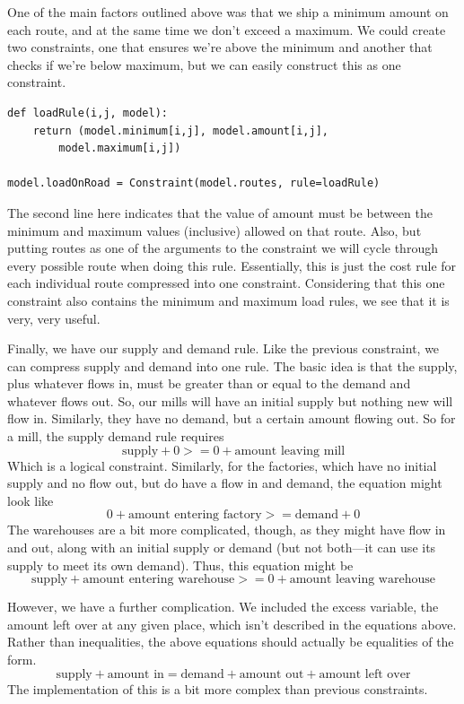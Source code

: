 \documentclass{article}
\begin{document}
One of the main factors outlined above was that we ship a minimum amount on each route, and at the same time we don't exceed a maximum.  We could create two constraints, one that ensures we're above the minimum and another that checks if we're below maximum, but we can easily construct this as one constraint.

\begin{verbatim}
def loadRule(i,j, model):
    return (model.minimum[i,j], model.amount[i,j], 
        model.maximum[i,j])

model.loadOnRoad = Constraint(model.routes, rule=loadRule)
\end{verbatim}

The second line here indicates that the value of amount must be between the minimum and maximum values (inclusive) allowed on that route.  Also, but putting routes as one of the arguments to the constraint we will cycle through every possible route when doing this rule.  Essentially, this is just the cost rule for each individual route compressed into one constraint.  Considering that this one constraint also contains the minimum and maximum load rules, we see that it is very, very useful.

Finally, we have our supply and demand rule.  Like the previous constraint, we can compress supply and demand into one rule.  The basic idea is that the supply, plus whatever flows in, must be greater than or equal to the demand and whatever flows out.  So, our mills will have an initial supply but nothing new will flow in.  Similarly, they have no demand, but a certain amount flowing out.  So for a mill, the supply demand rule requires
$$\textrm{supply} + 0 >= 0 + \textrm{amount leaving mill}$$
Which is a logical constraint.  Similarly, for the factories, which have no initial supply and no flow out, but do have a flow in and demand, the equation might look like
$$0 + \textrm{amount entering factory} >= \textrm{demand} +0$$
The warehouses are a bit more complicated, though, as they might have flow in and out, along with an initial supply or demand (but not both---it can use its supply to meet its own demand).  Thus, this equation might be
$$\textrm{supply} +\textrm{amount entering warehouse} >= 0 + \textrm{amount leaving warehouse}$$

However, we have a further complication.  We included the excess variable, the amount left over at any given place, which isn't described in the equations above.  Rather than inequalities, the above equations should actually be equalities of the form.
$$\textrm{supply} +\textrm{amount in} = \textrm{demand} +\textrm{amount out} +\textrm{amount left over}$$
The implementation of this is a bit more complex than previous constraints.
\end{document}
